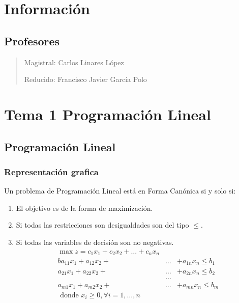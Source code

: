 \documentclass[12pt, twoside, openright]{report} %
\begin{document}
\listoffigures
\thispagestyle{fancy}





\chapter{Información}
\section{Profesores}
\begin{quote}
	Magistral: Carlos Linares López

	Reducido: Francisco Javier García Polo
\end{quote}



\chapter{Tema 1 Programación Lineal}

\section{Programación Lineal}

\subsection{Representación grafica}


Un problema de Programación Lineal está en Forma Canónica si y solo
si:

\begin{enumerate}
	\def\labelenumi{\arabic{enumi}.}
	\item El objetivo es de la forma de maximización.
	\item Si todas las restricciones son desigualdades son del tipo $\leq$.
	\item Si todas las variables de decisión son no negativas.
	      \begin{eqnarray*}
		      \max z = c_1x_1+c_2x_2 + \ldots +c_nx_n \\
		      ba_{11}x_1 +a_{12}x_2 +&\ldots& +a_{1n}x_n \leq b_1 \\
		      a_{21}x_1 +a_{22}x_2 +&\ldots& +a_{2n}x_n \leq b_2 \\
		      &\ldots& \\
		      a_{m1}x_1 +a_{m2}x_2 +&\ldots& +a_{mn}x_n \leq b_m \\
		      \text { donde } x_{i} \geq 0, \forall i=1, \ldots, n
	      \end{eqnarray*}
\end{enumerate}
\end{document}
